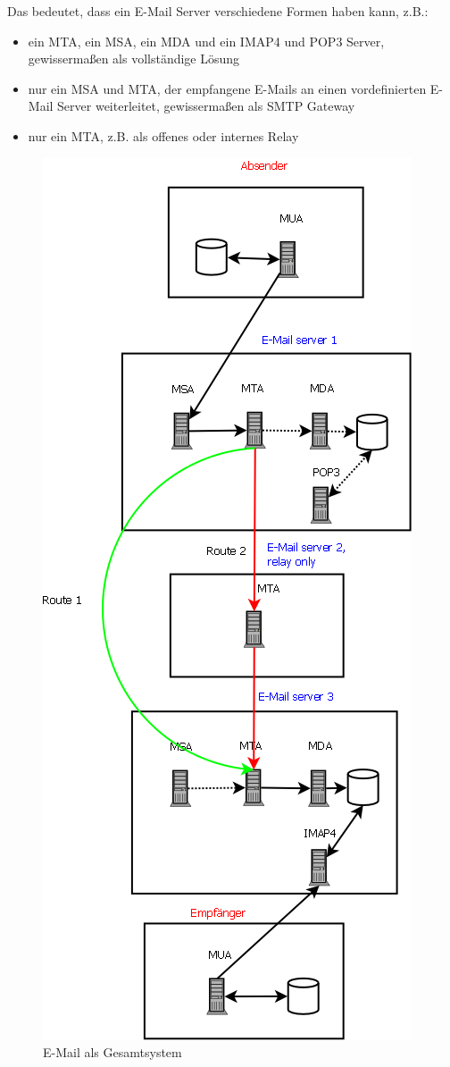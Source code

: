 Das bedeutet, dass ein E-Mail Server verschiedene Formen haben kann, z.B.:
\begin{itemize}
\item ein MTA, ein MSA, ein MDA und ein IMAP4 und POP3 Server, gewissermaßen als vollständige Lösung
\item nur ein MSA und MTA, der empfangene E-Mails an einen vordefinierten E-Mail Server weiterleitet, gewissermaßen als SMTP Gateway
\item nur ein MTA, z.B. als offenes oder internes Relay
\end{itemize}

\begin{figure}[htb]
	\centering
	\includegraphics[scale=0.5]{Content/Intro/Protokolle/emailg.png}
	\caption{E-Mail als Gesamtsystem}
	\label{fig:emailg}
\end{figure}

